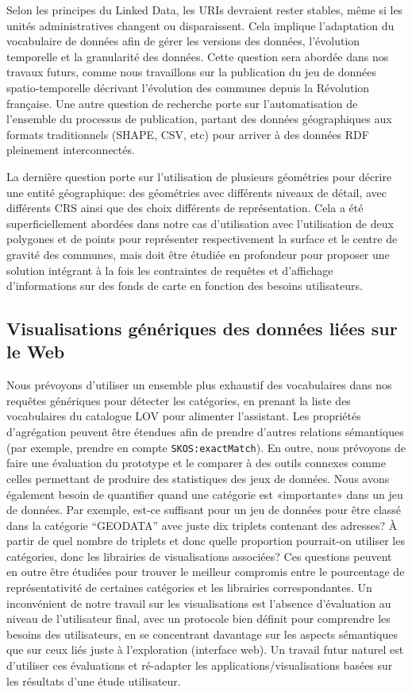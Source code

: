 \documentclass[a4paper,11pt,twoside]{report}
\begin{document}
Selon les principes du Linked Data, les URIs devraient rester stables, même si les unités administratives changent ou disparaissent. Cela implique l'adaptation du vocabulaire de données afin de gérer les versions des données, l'évolution temporelle et la granularité des données. Cette question sera abordée dans nos travaux futurs, comme nous travaillons sur la publication du jeu de données spatio-temporelle décrivant l'évolution des communes depuis la Révolution française. Une autre question de recherche porte sur l'automatisation de l'ensemble du processus de publication, partant des données géographiques aux formats traditionnels (SHAPE, CSV, etc) pour arriver à des données RDF pleinement interconnectés.

La dernière question porte sur l'utilisation de plusieurs géométries pour décrire une entité géographique: des géométries avec différents niveaux de détail, avec différents CRS ainsi que des choix différents de représentation. Cela a été superficiellement abordées dans notre cas d'utilisation avec l'utilisation de deux polygones et de points pour représenter respectivement la surface et le centre de gravité des communes, mais doit être étudiée en profondeur pour proposer une solution intégrant à la fois les contraintes de requêtes et d'affichage d'informations sur des fonds de carte en fonction des besoins utilisateurs.

\subsection*{Visualisations génériques des données liées sur le Web}
Nous prévoyons d'utiliser un ensemble plus exhaustif des vocabulaires dans nos requêtes génériques pour détecter les catégories, en prenant la liste des vocabulaires du catalogue LOV pour alimenter l'assistant. Les propriétés d'agrégation peuvent être étendues afin de prendre d'autres relations sémantiques (par exemple, prendre en compte \texttt{SKOS:exactMatch}). En outre, nous prévoyons de faire une évaluation du prototype et le comparer à des outils connexes comme celles permettant de produire des statistiques des jeux de données. Nous avons également besoin de quantifier quand une catégorie est «importante» dans un jeu de données. Par exemple, est-ce suffisant pour un jeu de données pour être classé dans la catégorie ``GEODATA'' avec juste dix triplets contenant des adresses? À partir de quel nombre de triplets et donc quelle proportion pourrait-on utiliser les catégories, donc les librairies de visualisations associées? Ces questions peuvent en outre être étudiées pour trouver le meilleur compromis entre le pourcentage de représentativité de certaines catégories et les librairies correspondantes. Un  inconvénient de notre travail sur les visualisations est l'absence d'évaluation au niveau de l'utilisateur final, avec un protocole bien définit pour comprendre les besoins des utilisateurs, en se concentrant davantage sur les aspects sémantiques que sur ceux liés juste à l'exploration (interface web). Un travail futur naturel est d'utiliser ces évaluations et ré-adapter les applications/visualisations basées sur les résultats d'une étude utilisateur.
\end{document}
